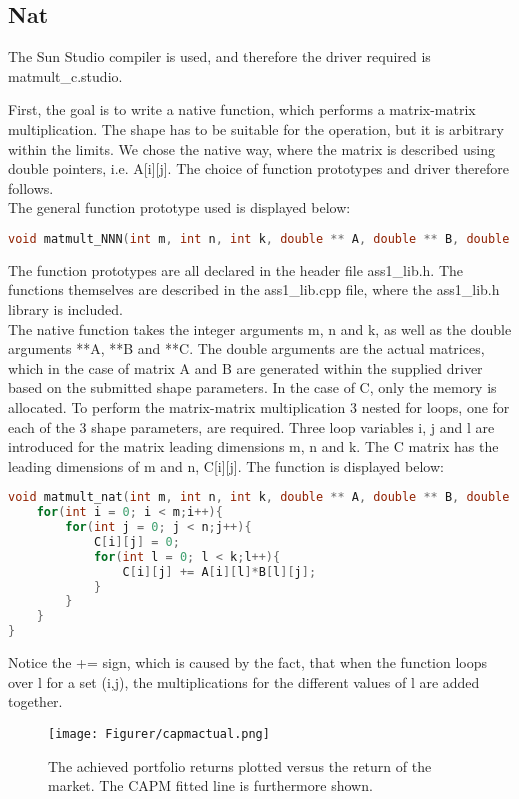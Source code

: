 \subsection{Nat}

The Sun Studio compiler is used, and therefore the driver required is matmult\_c.studio.


First, the goal is to write a native function, which performs a matrix-matrix multiplication. The shape has to be suitable for the operation, but it is arbitrary within the limits. We chose the native way, where the matrix is described using double pointers, i.e. A[i][j]. The choice of function prototypes and driver therefore follows.  \\
The general function prototype used is displayed below:
\begin{lstlisting}[language=C++, caption=Function Prototype]
void matmult_NNN(int m, int n, int k, double ** A, double ** B, double ** C)
\end{lstlisting}

The function prototypes are all declared in the header file ass1\_lib.h. The functions themselves are described in the ass1\_lib.cpp file, where the ass1\_lib.h library is included. \\

The native function takes the integer arguments m, n and k, as well as the double arguments **A, **B and **C. The double arguments are the actual matrices, which in the case of matrix A and B are generated within the supplied driver based on the submitted shape parameters. In the case of C, only the memory is allocated. To perform the matrix-matrix multiplication 3 nested for loops, one for each of the 3 shape parameters, are required. Three loop variables i, j and l are introduced for the matrix leading dimensions m, n and k. The C matrix has the leading dimensions of m and n, C[i][j]. The function is displayed below:

\begin{lstlisting}[language=C++, caption=Function Prototype]
void matmult_nat(int m, int n, int k, double ** A, double ** B, double ** C){
	for(int i = 0; i < m;i++){
		for(int j = 0; j < n;j++){
			C[i][j] = 0;
			for(int l = 0; l < k;l++){
				C[i][j] += A[i][l]*B[l][j];
			}
		}
	}
}
\end{lstlisting}

Notice the += sign, which is caused by the fact, that when the function loops over l for a set (i,j), the multiplications for the different values of l are added together.


\begin{figure}[h!] 
	\begin{center}
		\texttt{[image: Figurer/capmactual.png]} 
		\caption{The achieved portfolio returns plotted versus the return of the market. The CAPM fitted line is furthermore shown. }
		\label{fig:capm}
	\end{center}
\end{figure}
